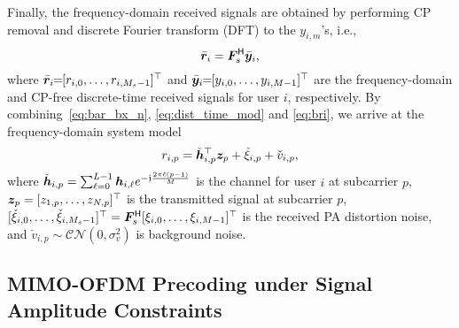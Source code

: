 \documentclass[10pt,twocolumn,twoside]{IEEEtran}
\begin{document}
Finally, the frequency-domain received signals are obtained by performing CP removal and discrete Fourier transform (DFT) to the $y_{i,m}$'s, i.e.,
\begin{equation}\label{eq:bri}
	\bar {{\bm r}}_i = {\bm F}_s^{\mathsf{H}} \bar {{\bm y}}_i,
\end{equation}
where
$\bar {{\bm r}}_i  \!\! = \!\! [r_{i,0}, \dots, r_{i,M_s-1}]^\top$ and
$\bar {{\bm y}}_i \!\! = \!\! [y_{i,0}, \dots, y_{i,M-1}]^\top$ are the frequency-domain and CP-free discrete-time received signals for user $i$, respectively.
By combining~\eqref{eq:bar_bx_n}, \eqref{eq:dist_time_mod} and \eqref{eq:bri}, we arrive at the frequency-domain system model
\begin{equation}\label{eq:freq_mod}
	r_{i,p} = \check \bh_{i,p}^\Tsf \bz_p+ \check \xi_{i,p} + \check v_{i,p}, %
\end{equation}
where
$\check {{\bm h}}_{i,p} = \sum_{\ell=0}^{L-1} {{\bm h}}_{i,\ell} e^{-{\mathfrak j} \frac{2 \pi \ell (p-1)}{M} }$ is the channel for user $i$ at subcarrier $p$,
${\bm z}_p = [z_{1,p},\dots,z_{N,p}]^\top$ is the transmitted signal at subcarrier $p$,
$[\check \xi_{i,0}, \dots, \check \xi_{i,M_s-1}]^\top = {\bm F}_s^{\mathsf{H}} [\xi_{i,0},\dots,\xi_{i,M-1}]^\top$ is the received PA distortion noise, and
$\check v_{i,p} \sim \mathcal{CN}(0,\sigma^2_v)$ is background noise.













\subsection{MIMO-OFDM Precoding under Signal Amplitude Constraints}
\label{sec:precoding}
\end{document}
